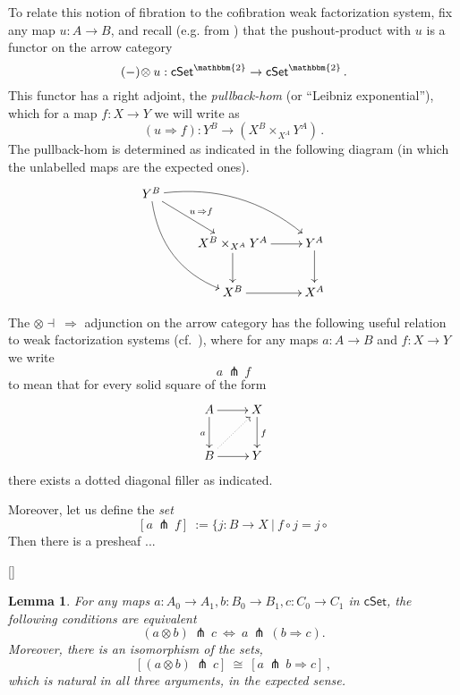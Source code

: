 \documentclass[12pt]{article}
\newcommand{\ednote}[1]{[\textit{\color{red}{#1}}]} %
\newcommand{\cSet}{\ensuremath{\mathsf{cSet}}}
\newcommand{\ra}{\ensuremath{\rightarrow}}
\newtheorem{lemma}[theorem]{Lemma}
\theoremstyle{remark}
\theoremstyle{definition}
\begin{document}
To relate this notion of fibration to the cofibration weak factorization system, fix any map $u : A \ra B$, and recall (e.g. from \cite{R}) that the pushout-product with $u$ is a functor on the arrow category 
\[
(-)\!\otimes u : \cSet^\mathbbm{2} \ra\cSet^\mathbbm{2}\,.
\]
This functor has a right adjoint, the \emph{pullback-hom} (or ``Leibniz exponential''), which for a map $f : X\ra Y$ we will write as
\[
(u \Rightarrow\! f) : Y^B \ra (X^B \times_{X^A} Y^A) \,.
\]
The pullback-hom is determined as indicated in the following diagram (in which the unlabelled maps are the expected ones).
\begin{equation}\label{diagram:pullbackhom}
\xymatrix{
Y^B \ar@/_4ex/ [rdd] \ar[rd]^{u\, \Rightarrow f} \ar@/^4ex/ [rrd] && \\
& X^B \times_{X^A} Y^A \ar[d] \ar[r] & Y^A \ar[d] \\
& X^B \ar[r] &  X^A 
}
\end{equation}

The $\otimes\dashv\ \Rightarrow$ adjunction on the arrow category has the following useful relation to weak factorization systems (cf.~\cite{GS,Riehl,JT}), where for any maps $a : A \ra B$ and $f : X\ra Y$ we write 
\[
a\, \pitchfork\, f 
\]
to mean that for every solid square of the form
\begin{equation}\label{eq:defpitchfork}
\xymatrix{
A\ar[d]_{a} \ar[r] & X \ar[d]^f \\
B \ar@{.>}[ru] \ar[r] & Y
}
\end{equation}
there exists a dotted diagonal filler as indicated. 

Moreover, let us define the \emph{set}
\[
[a\, \pitchfork\, f]\ := \{ j : B \to X\ |\ f\circ j = j\circ 
\]
Then there is a presheaf ...

\ednote{fill this in and \cite{Riehl}.}


\begin{lemma}\label{lemma:Leibniz}
For any maps $a : A_0 \to A_1, b : B_0 \to B_1, c : C_0 \to C_1$ in $\cSet$, 
the following \emph{conditions} are equivalent
\[
(a\otimes b)\, \pitchfork\, c\  \Leftrightarrow\ a\, \pitchfork\, (b\Rightarrow\! c).
\]
Moreover, there is an isomorphism of the \emph{sets},
\[
[(a\otimes b)\, \pitchfork\, c]\  \cong\ [a\, \pitchfork\, b\Rightarrow\! c]\,,
\]
which is natural in all three arguments, in the expected sense.
\end{lemma}
\end{document}

